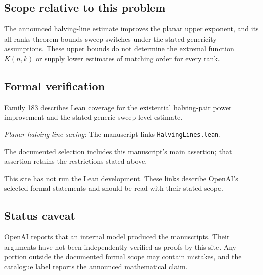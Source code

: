 \documentclass[11pt]{article}
\begin{document}
\subsection{Scope relative to this problem}
The announced halving-line estimate improves the planar upper exponent, and its all-ranks theorem bounds sweep switches under the stated genericity assumptions. These upper bounds do not determine the extremal function $K(n,k)$ or supply lower estimates of matching order for every rank.

\subsection{Formal verification}
Family 183 describes Lean coverage for the existential halving-pair power improvement and the stated generic sweep-level estimate.

\textit{Planar halving-line saving}: The manuscript links \texttt{HalvingLines.lean}.

The documented selection includes this manuscript’s main assertion; that assertion retains the restrictions stated above.

This site has not run the Lean development. These links describe OpenAI’s selected formal statements and should be read with their stated scope.

\subsection{Status caveat}
OpenAI reports that an internal model produced the manuscripts. Their arguments have not been independently verified as proofs by this site. Any portion outside the documented formal scope may contain mistakes, and the catalogue label reports the announced mathematical claim.
\end{document}
